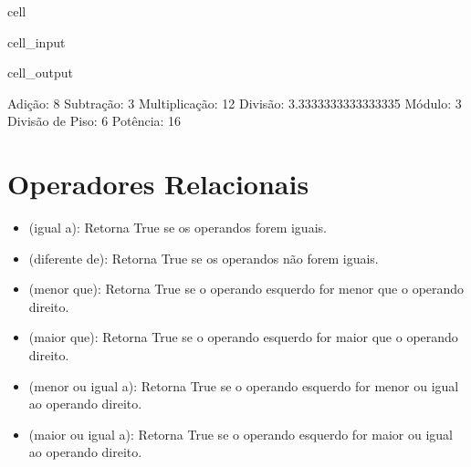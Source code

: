 \documentclass[letterpaper,10pt,english]{jupyterBook}
\begin{document}
\begin{sphinxuseclass}{cell}
\begin{sphinxVerbatimInput}
\begin{sphinxuseclass}{cell_input}
\end{sphinxuseclass}\end{sphinxVerbatimInput}
\begin{sphinxVerbatimOutput}

\begin{sphinxuseclass}{cell_output}
\begin{sphinxVerbatim}[commandchars=\\\{\}]
Adição: 8
Subtração: 3
Multiplicação: 12
Divisão: 3.3333333333333335
Módulo: 3
Divisão de Piso: 6
Potência: 16
\end{sphinxVerbatim}

\end{sphinxuseclass}\end{sphinxVerbatimOutput}

\end{sphinxuseclass}

\section{Operadores Relacionais}
\label{\detokenize{chapters/ch3/ch3:operadores-relacionais}}\begin{itemize}
\item {} 
\sphinxAtStartPar
\sphinxcode{\sphinxupquote{==}} (igual a): Retorna True se os operandos forem iguais.

\item {} 
\sphinxAtStartPar
\sphinxcode{\sphinxupquote{!=}} (diferente de): Retorna True se os operandos não forem iguais.

\item {} 
\sphinxAtStartPar
\sphinxcode{\sphinxupquote{<}} (menor que): Retorna True se o operando esquerdo for menor que o operando direito.

\item {} 
\sphinxAtStartPar
\sphinxcode{\sphinxupquote{>}} (maior que): Retorna True se o operando esquerdo for maior que o operando direito.

\item {} 
\sphinxAtStartPar
\sphinxcode{\sphinxupquote{<=}} (menor ou igual a): Retorna True se o operando esquerdo for menor ou igual ao operando direito.

\item {} 
\sphinxAtStartPar
\sphinxcode{\sphinxupquote{>=}} (maior ou igual a): Retorna True se o operando esquerdo for maior ou igual ao operando direito.

\end{itemize}
\end{document}
